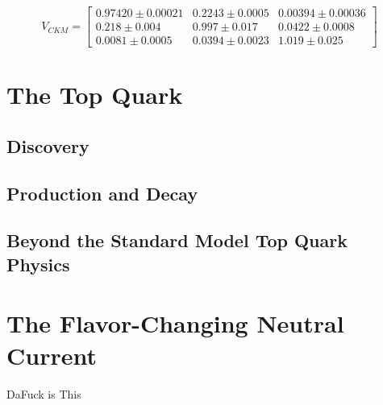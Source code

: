 \[ V_{CKM} =
\begin{bmatrix}
0.97420 \pm 0.00021 & 0.2243 \pm 0.0005 & 0.00394 \pm 0.00036 \\ 
0.218 \pm 0.004 & 0.997 \pm 0.017 & 0.0422 \pm 0.0008 \\
0.0081 \pm 0.0005 & 0.0394 \pm 0.0023 & 1.019 \pm 0.025 
\end{bmatrix}
\]

\section{The Top Quark}
\subsection{Discovery}
\subsection{Production and Decay}
\subsection{Beyond the Standard Model Top Quark Physics}
\section{The Flavor-Changing Neutral Current}
 DaFuck is This

%

